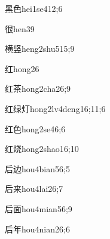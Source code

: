\begin{verbete}{黑色}{hei1se4}{12;6}
\end{verbete}

\begin{verbete}{很}{hen3}{9}
\end{verbete}

\begin{verbete}{横竖}{heng2shu5}{15;9}
\end{verbete}

\begin{verbete}{红}{hong2}{6}
\end{verbete}

\begin{verbete}{红茶}{hong2cha2}{6;9}
\end{verbete}

\begin{verbete}{红绿灯}{hong2lv4deng1}{6;11;6}
\end{verbete}

\begin{verbete}{红色}{hong2se4}{6;6}
\end{verbete}

\begin{verbete}{红烧}{hong2shao1}{6;10}
\end{verbete}

\begin{verbete}{后边}{hou4bian5}{6;5}
\end{verbete}

\begin{verbete}{后来}{hou4lai2}{6;7}
\end{verbete}

\begin{verbete}{后面}{hou4mian5}{6;9}
\end{verbete}

\begin{verbete}{后年}{hou4nian2}{6;6}
\end{verbete}

